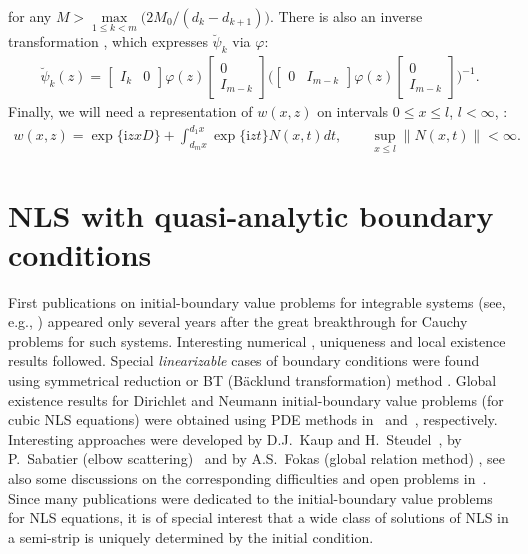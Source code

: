 \documentclass[pdftex]{sigma}
\newcommand{\I}{\mathrm{i}}
\numberwithin{equation}{section}
\begin{document}
for any $M>\max\limits_{1\leq k<m}\big(2M_0/(d_k-d_{k+1})\big)$. There is also an inverse transformation \cite[Remark~4.6]{SaSaR}, which expresses $\breve \psi_k$ via $\varphi$:
\begin{gather}
  \breve\psi_k^{\,} (z)
= \begin{bmatrix} I_k & 0\end{bmatrix}
 \varphi (z)
 \left[
  \begin{matrix}
    0  \\
    I_{m-k}
  \end{matrix}
 \right]
 \biggl(
 \begin{bmatrix} 0 & I_{m-k}\end{bmatrix}
  \varphi (z)
  \left[
  \begin{matrix}
    0  \\
    I_{m-k}
  \end{matrix}
  \right]
 \biggr)^{-1} .
 \label{NW17}
\end{gather}
Finally, we will need a representation of $w(x,z)$ on intervals $0\leq x\leq l$, $l<\infty$, \cite[equation~(4.37)]{SaSaR} :
\begin{gather}
  w(x,z) = \exp \{ \I z x D\}
    + \int_{d_m x}^{d_1 x}
           \exp \{\I zt\}
     N(x,t)
     dt, \qquad \sup_{x\leq l} \| N(x,t) \| < \infty.
 \label{NW18}
\end{gather}


\section{NLS with quasi-analytic boundary conditions}\label{Quasi}

First publications on initial-boundary value problems for integrable systems (see, e.g., \cite{Kv, KaNe}) appeared only several years after
the great breakthrough for Cauchy problems for such systems.
Interesting numerical \cite{ChuX}, uniqueness \cite{BW83, Ton} and local existence \cite{Holm, Kri} results followed.
Special {\it linearizable} cases of boundary conditions were found using symmetrical reduction \cite{Skl} or BT (B\"acklund transformation) method
\cite{BiTa, Hab}. Global existence results for Dirichlet and Neumann initial-boundary value problems (for cubic NLS equations)
were obtained using PDE methods in~\cite{CB} and~\cite{Kai}, respectively. Interesting approaches were developed by
D.J.~Kaup and H.~Steudel~\cite{KaSt}, by P.~Sabatier (elbow scattering)~\cite{Sab1, Sab3} and by
 A.S.~Fokas (global relation method)
 \cite{Fok}, see also some discussions on the corresponding dif\/f\/iculties and open problems in~\cite{Ash, BoFo}.
Since many publications were dedicated to the initial-boundary value problems for NLS equations, it is of special interest
that a wide class of solutions of NLS in a semi-strip is uniquely determined by the initial condition.
\end{document}

